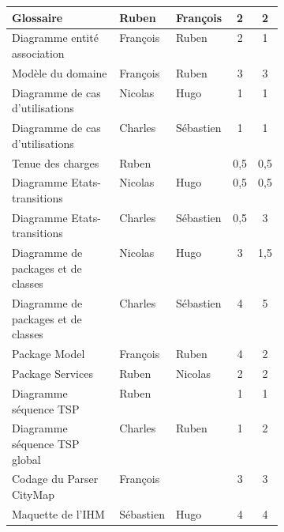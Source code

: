 \begin{longtable}{|p{0.4\linewidth}|l|l|c|c|}
Glossaire                            & Ruben            & François    & 2                    & 2                   \\ \hline
Diagramme entité association         & François         & Ruben       & 2                    & 1                   \\ \hline
Modèle du domaine                    & François         & Ruben       & 3                    & 3                   \\ \hline
Diagramme de cas d'utilisations      & Nicolas          & Hugo        & 1                    & 1                   \\ \hline
Diagramme de cas d'utilisations      & Charles          & Sébastien   & 1                    & 1                   \\ \hline
Tenue des charges                    & Ruben            &             & 0,5                  & 0,5                 \\ \hline
Diagramme Etats-transitions          & Nicolas          & Hugo        & 0,5                  & 0,5                 \\ \hline
Diagramme Etats-transitions          & Charles          & Sébastien   & 0,5                  & 3                   \\ \hline
Diagramme de packages et de classes  & Nicolas          & Hugo        & 3                    & 1,5                 \\ \hline
Diagramme de packages et de classes  & Charles          & Sébastien   & 4                    & 5                   \\ \hline
Package Model                        & François         & Ruben       & 4                    & 2                   \\ \hline
Package Services                     & Ruben            & Nicolas     & 2                    & 2                   \\ \hline
Diagramme séquence TSP               & Ruben            &             & 1                    & 1                   \\ \hline
Diagramme séquence TSP global        & Charles          & Ruben       & 1                    & 2                   \\ \hline
Codage du Parser CityMap             & François         &             & 3                    & 3                   \\ \hline
Maquette de l'IHM                    & Sébastien        & Hugo        & 4                    & 4                   \\ \hline

\end{longtable}
